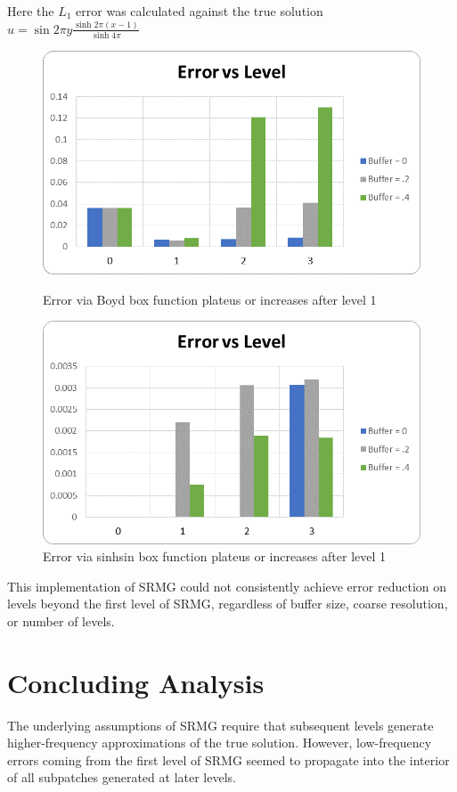 \documentclass[final]{siamart1116}
\numberwithin{theorem}{section}
\begin{document}
Here the $L_1$ error was calculated against the true solution $u = \sin{2\pi y}\frac{\sinh{2 \pi (x-1)} }{\sinh{4\pi}}$

\begin{figure}[H]
{}
  \includegraphics[width=\linewidth]{convergencechebsinhsin.png}
  \caption{Error via Boyd box function plateus or increases after level 1}
\endminipage\hfill
{}%
  \includegraphics[width=\linewidth]{convergencefouriersinhsin.png}
  \caption{Error via sinhsin box function plateus or increases after level 1}
\endminipage
\end{figure}


This implementation of SRMG could not consistently achieve error reduction on levels beyond the first level of SRMG, regardless of buffer size, coarse resolution, or number of levels. 

\section{Concluding Analysis}
The underlying assumptions of SRMG require that subsequent levels generate higher-frequency approximations of the true solution. However, low-frequency errors coming from the first level of SRMG seemed to propagate into the interior of all subpatches generated at later levels.  
\end{document}
